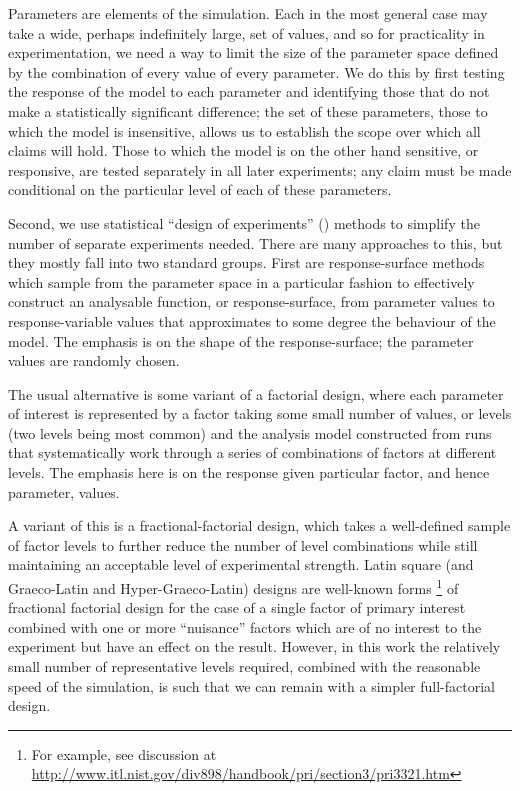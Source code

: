 Parameters are elements of the simulation. Each in the most general case may take a wide, perhaps indefinitely large, set of values, and so for practicality in experimentation, we need a way to limit the size of the parameter space defined by the combination of every value of every parameter. We do this by first testing the response of the model to each parameter and identifying those that do not make a statistically significant difference; the set of these parameters, those to which the model is insensitive, allows us to establish the scope over which all claims will hold. Those to which the model is on the other hand sensitive, or responsive, are tested separately in all later experiments; any claim must be made conditional on the particular level of each of these parameters.

Second, we use statistical ``design of experiments'' (\eg \cite{Montgomery2009}) methods to simplify the number of separate experiments needed. There are many approaches to this, but they mostly fall into two standard groups. First are response-surface methods which sample from the parameter space in a particular fashion to effectively construct an analysable function, or response-surface, from parameter values to response-variable values that approximates to some degree the behaviour of the model. The emphasis is on the shape of the response-surface; the parameter values are randomly chosen.

The usual alternative is some variant of a factorial design, where each parameter of interest is represented by a factor taking some small number of values, or levels (two levels being most common) and the analysis model constructed from runs that systematically work through a series of combinations of factors at different levels. The emphasis here is on the response given particular factor, and hence parameter, values. 

A variant of this is a fractional-factorial design, which takes a well-defined sample of factor levels to further reduce the number of level combinations while still maintaining an acceptable level of experimental strength. Latin square (and Graeco-Latin and Hyper-Graeco-Latin) designs are well-known forms \footnote{For example, see discussion at \url{http://www.itl.nist.gov/div898/handbook/pri/section3/pri3321.htm}} of fractional factorial design for the case of a single factor of primary interest combined with one or more ``nuisance'' factors which are of no interest to the experiment but have an effect on the result. However, in this work the relatively small number of representative levels required, combined with the reasonable speed of the simulation, is such that we can remain with a simpler full-factorial design.

